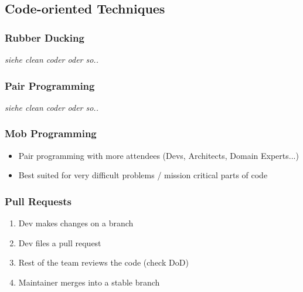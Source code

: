\subsection{Code-oriented Techniques}
\subsubsection{Rubber Ducking}
\textit{siehe clean coder oder so..}

\subsubsection{Pair Programming}
\textit{siehe clean coder oder so..}

\subsubsection{Mob Programming}
\begin{itemize}
    \item Pair programming with more attendees (Devs, Architects, Domain Experts...)
    \item Best suited for very difficult problems / mission critical parts of code
\end{itemize}

\subsubsection{Pull Requests}
\begin{enumerate}
    \item Dev makes changes on a branch
    \item Dev files a pull request
    \item Rest of the team reviews the code (check DoD)
    \item Maintainer merges into a stable branch
\end{enumerate}

